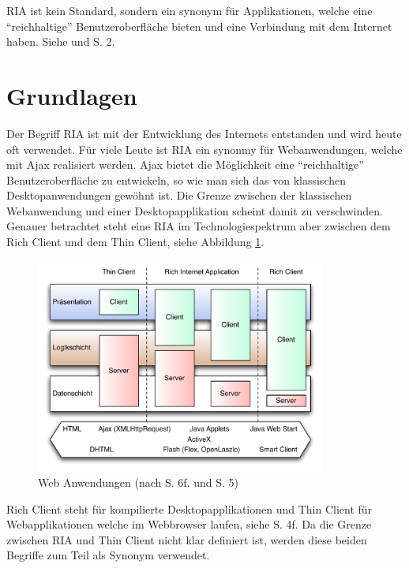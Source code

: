   \ac{RIA} ist kein Standard, sondern ein synonym für Applikationen, welche
  eine ``reichhaltige'' Benutzeroberfläche bieten und eine Verbindung mit dem
  Internet haben. Siehe \cite{RichInternetApplication} und
  \cite{RichInternetApplicationsWhitePaper} S. 2.
  
  \section{Grundlagen}
  
  Der Begriff \ac{RIA} ist mit der Entwicklung des Internets entstanden und
  wird heute oft verwendet. Für viele Leute ist \ac{RIA} ein synonmy für
  Webanwendungen, welche mit \ac{Ajax} realisiert werden. \ac{Ajax} bietet die
  Möglichkeit eine ``reichhaltige'' Benutzeroberfläche zu entwickeln, so wie
  man sich das von klassischen Desktopanwendungen gewöhnt ist. Die Grenze
  zwischen der klassischen Webanwendung und einer Desktopapplikation scheint
  damit zu verschwinden. Genauer betrachtet steht eine \ac{RIA} im
  Technologiespektrum aber zwischen dem Rich Client und dem Thin Client, siehe
  Abbildung \ref{img:webanwendungen}.
  
  \begin{figure}[h]
    \begin{center}
      \includegraphics[width=0.85\textwidth]{./image/webanwendungen.pdf}
      \caption{Web Anwendungen (nach \cite{DiplomarbeitStephanSchuster} S. 6f.
      und \cite{WebApplicationSolutions} S. 5)}
      \label{img:webanwendungen}
    \end{center}
  \end{figure}
  
  Rich Client steht für kompilierte Desktopapplikationen und Thin Client für
  Webapplikationen welche im Webbrowser laufen, siehe
  \cite{WebApplicationSolutions} S. 4f. Da die Grenze zwischen \ac{RIA} und
  Thin Client nicht klar definiert ist, werden diese beiden Begriffe zum Teil
  als Synonym verwendet.
  
